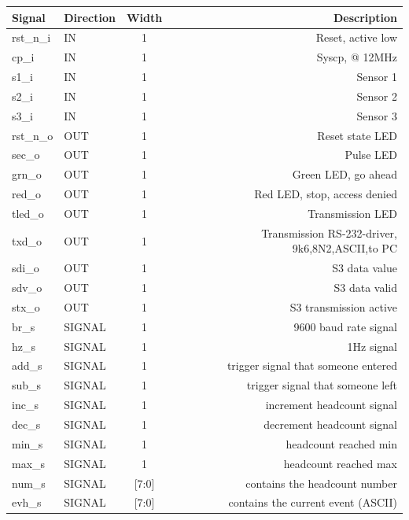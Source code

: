 \documentclass[12pt,a4 paper] {report}
\begin{document}
\begin{center}
	\begin{tabular}{|l|l|c|r|}
		\hline
		\textbf{Signal} & \textbf{Direction} & \textbf{Width} & \textbf{Description} \\
		\hline
		\hline
		rst\_n\_i & IN & 1 & Reset, active low \\
		\hline
		cp\_i & IN & 1 & Syscp, @ 12MHz \\
		\hline
		s1\_i & IN & 1 & Sensor 1 \\
		\hline
		s2\_i & IN & 1 & Sensor 2 \\
		\hline
		s3\_i & IN & 1 & Sensor 3 \\
		\hline
		rst\_n\_o & OUT & 1 & Reset state LED  \\
		\hline
		sec\_o & OUT & 1 & Pulse LED \\
		\hline
		grn\_o & OUT & 1 & Green LED, go ahead \\
		\hline
		red\_o & OUT & 1 & Red LED, stop, access denied \\
		\hline
		tled\_o & OUT & 1 & Transmission LED \\
		\hline
		txd\_o & OUT & 1 & Transmission RS-232-driver, 9k6,8N2,ASCII,to PC \\
		\hline
		sdi\_o & OUT & 1 & S3 data value \\
		\hline
		sdv\_o & OUT & 1 & S3 data valid \\
		\hline
		stx\_o & OUT & 1 & S3 transmission active \\
		\hline
		\hline
		br\_s & SIGNAL & 1 & 9600 baud rate signal \\
		\hline
		hz\_s & SIGNAL & 1 & 1Hz signal \\
		\hline
		add\_s & SIGNAL & 1 & trigger signal that someone entered \\
		\hline
		sub\_s & SIGNAL & 1 & trigger signal that someone left \\
		\hline
		inc\_s & SIGNAL & 1 & increment headcount signal \\
		\hline
		dec\_s & SIGNAL & 1 & decrement headcount signal \\
		\hline
		min\_s & SIGNAL & 1 & headcount reached min \\
		\hline
		max\_s & SIGNAL & 1 & headcount reached max \\
		\hline
		num\_s & SIGNAL & [7:0] & contains the headcount number \\
		\hline
		evh\_s & SIGNAL & [7:0] & contains the current event (ASCII) \\
		\hline
	\end{tabular}
\end{center}
\end{document}

